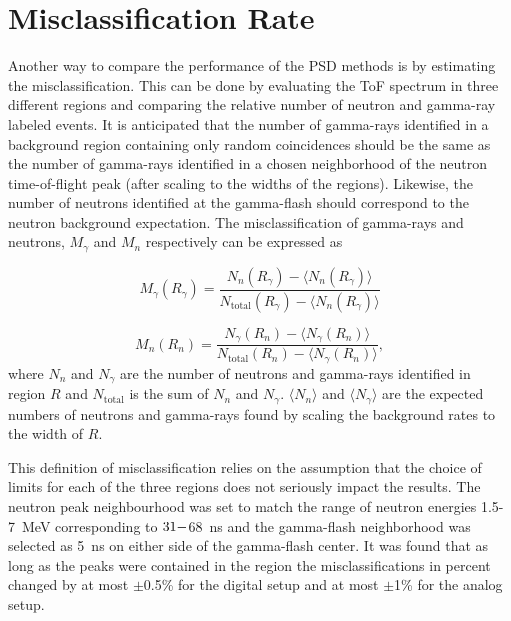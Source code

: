 \documentclass[main.tex]{subfiles}
\begin{document}
\clearpage
\section{Misclassification Rate}\label{sec:comp}


Another way to compare the performance of the PSD methods is by estimating the misclassification. This can be done by evaluating the ToF spectrum in three different regions and comparing the relative number of neutron and gamma-ray labeled events. It is anticipated that the number of gamma-rays identified in a background region containing only random coincidences should be the same as the number of gamma-rays identified in a chosen neighborhood of the neutron time-of-flight peak (after scaling to the widths of the regions). Likewise, the number of neutrons identified at the gamma-flash should correspond to the neutron background expectation. The misclassification of gamma-rays and neutrons, $M_{\gamma}$ and $M_{n}$ respectively can be expressed as

\begin{equation}
	M_\gamma(R_\gamma) = \frac{N_{n}(R_\gamma)-\langle N_n(R_\gamma)\rangle}{N_{\textrm{total}}(R_\gamma)-\langle N_n(R_\gamma)\rangle}
\end{equation}

\begin{equation}
	M_n(R_n) = \frac{N_{\gamma}(R_n)-\langle N_\gamma(R_n)\rangle}{N_{\textrm{total}}(R_n)-\langle N_\gamma(R_n)\rangle},
\end{equation}
where $N_n$ and $N_\gamma$ are the number of neutrons and gamma-rays identified in region $R$ and $N_{\textrm{total}}$ is the sum of $N_n$ and $N_\gamma$. $\langle N_n\rangle$ and $\langle N_\gamma\rangle$ are the expected numbers of neutrons and gamma-rays found by scaling the background rates to the width of $R$.

This definition of misclassification relies on the assumption that the choice of limits for each of the three regions does not seriously impact the results. The neutron peak neighbourhood was set to match the range of neutron energies 1.5-\SI{7}{\MeV} corresponding to $31\--$\SI{68}{ns} and the gamma-flash neighborhood was selected as \SI{5}{\ns} on either side of the gamma-flash center.
It was found that as long as the peaks were contained in the region the misclassifications in percent changed by at most $\pm$0.5\% for the digital setup and at most $\pm$1\% for the analog setup. 
\end{document}
